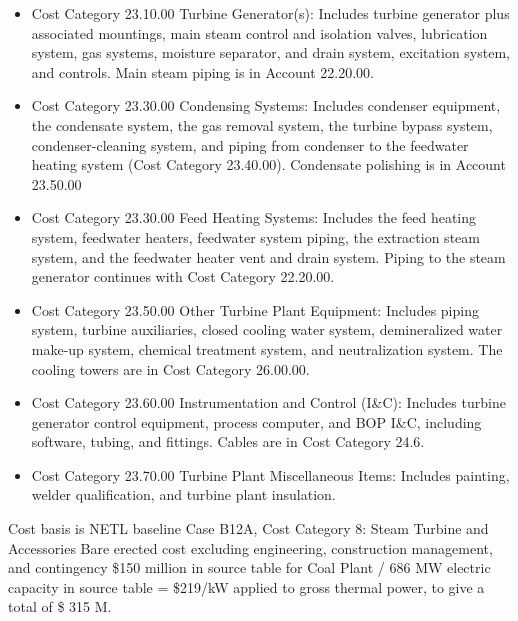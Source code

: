 \begin{itemize}
    \item Cost Category 23.10.00 Turbine Generator(s): Includes turbine generator plus associated mountings, main steam control and isolation valves, lubrication system, gas systems, moisture separator, and drain system, excitation system, and controls. Main steam piping is in Account 22.20.00.
    \item Cost Category 23.30.00 Condensing Systems: Includes condenser equipment, the condensate system, the gas removal system, the turbine bypass system, condenser-cleaning system, and piping from condenser to the feedwater heating system (Cost Category 23.40.00). Condensate polishing is in Account 23.50.00
    \item Cost Category 23.30.00 Feed Heating Systems: Includes the feed heating system, feedwater heaters, feedwater system piping, the extraction steam system, and the feedwater heater vent and drain system. Piping to the steam generator continues with Cost Category 22.20.00.
    \item Cost Category 23.50.00 Other Turbine Plant Equipment: Includes piping system, turbine auxiliaries, closed cooling water system, demineralized water make-up system, chemical treatment system, and neutralization system. The cooling towers are in Cost Category 26.00.00.
    \item Cost Category 23.60.00 Instrumentation and Control (I\&C): Includes turbine generator control equipment, process computer, and BOP I\&C, including software, tubing, and fittings. Cables are in Cost Category 24.6.
    \item Cost Category 23.70.00 Turbine Plant Miscellaneous Items: Includes painting, welder qualification, and turbine plant insulation.
\end{itemize}

Cost basis is NETL baseline Case B12A, Cost Category 8: Steam Turbine and Accessories Bare erected cost excluding engineering, construction management, and contingency \$150 million in source table for Coal Plant / 686 MW electric capacity in source table = \$219/kW applied to gross thermal power, to give a total of \$ 315 M.